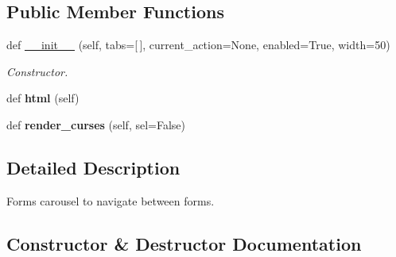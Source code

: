 \subsection*{Public Member Functions}
\begin{DoxyCompactItemize}
\item 
def \hyperlink{classwax_1_1Components_1_1WFormsCarousel_a853fcd7ebd11dfb818ecabdf043b15e9}{\+\_\+\+\_\+init\+\_\+\+\_\+} (self, tabs=\mbox{[}$\,$\mbox{]}, current\+\_\+action=None, enabled=True, width=50)
\begin{DoxyCompactList}\small\item\em Constructor. \end{DoxyCompactList}\item 
def {\bfseries html} (self)\hypertarget{classwax_1_1Components_1_1WFormsCarousel_a3d759bcebb338b88ce0d2c92a2c863b7}{}\label{classwax_1_1Components_1_1WFormsCarousel_a3d759bcebb338b88ce0d2c92a2c863b7}

\item 
def {\bfseries render\+\_\+curses} (self, sel=False)\hypertarget{classwax_1_1Components_1_1WFormsCarousel_a2a4d988d443a2e556e8023c9daeb7959}{}\label{classwax_1_1Components_1_1WFormsCarousel_a2a4d988d443a2e556e8023c9daeb7959}

\end{DoxyCompactItemize}


\subsection{Detailed Description}
Forms carousel to navigate between forms. 

\subsection{Constructor \& Destructor Documentation}
